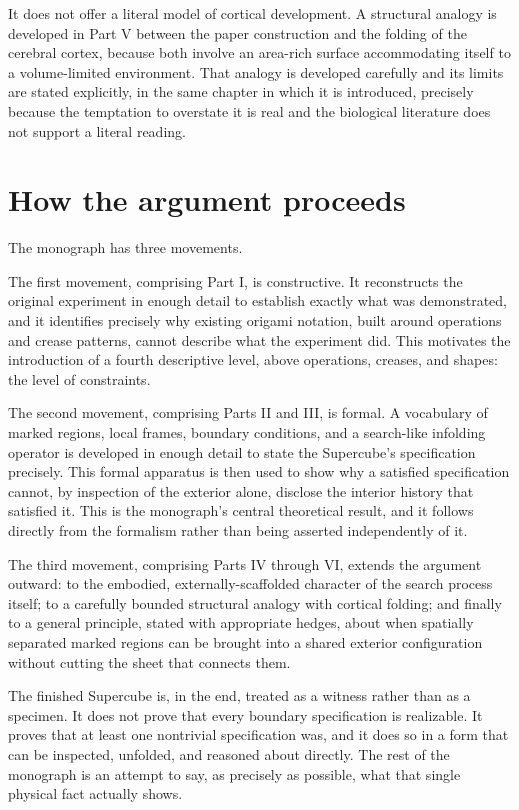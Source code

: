 \documentclass[11pt,oneside]{book}
\begin{document}
It does not offer a literal model of cortical development. A structural
analogy is developed in Part V between the paper construction and the
folding of the cerebral cortex, because both involve an area-rich
surface accommodating itself to a volume-limited environment. That
analogy is developed carefully and its limits are stated explicitly, in
the same chapter in which it is introduced, precisely because the
temptation to overstate it is real and the biological literature does
not support a literal reading.

\hypertarget{how-the-argument-proceeds}{%
\section{How the argument proceeds}\label{how-the-argument-proceeds}}

The monograph has three movements.

The first movement, comprising Part I, is constructive. It reconstructs
the original experiment in enough detail to establish exactly what was
demonstrated, and it identifies precisely why existing origami notation,
built around operations and crease patterns, cannot describe what the
experiment did. This motivates the introduction of a fourth descriptive
level, above operations, creases, and shapes: the level of constraints.

The second movement, comprising Parts II and III, is formal. A
vocabulary of marked regions, local frames, boundary conditions, and a
search-like infolding operator is developed in enough detail to state
the Supercube's specification precisely. This formal apparatus is then
used to show why a satisfied specification cannot, by inspection of the
exterior alone, disclose the interior history that satisfied it. This is
the monograph's central theoretical result, and it follows directly from
the formalism rather than being asserted independently of it.

The third movement, comprising Parts IV through VI, extends the argument
outward: to the embodied, externally-scaffolded character of the search
process itself; to a carefully bounded structural analogy with cortical
folding; and finally to a general principle, stated with appropriate
hedges, about when spatially separated marked regions can be brought
into a shared exterior configuration without cutting the sheet that
connects them.

The finished Supercube is, in the end, treated as a witness rather than
as a specimen. It does not prove that every boundary specification is
realizable. It proves that at least one nontrivial specification was,
and it does so in a form that can be inspected, unfolded, and reasoned
about directly. The rest of the monograph is an attempt to say, as
precisely as possible, what that single physical fact actually shows.
\end{document}
